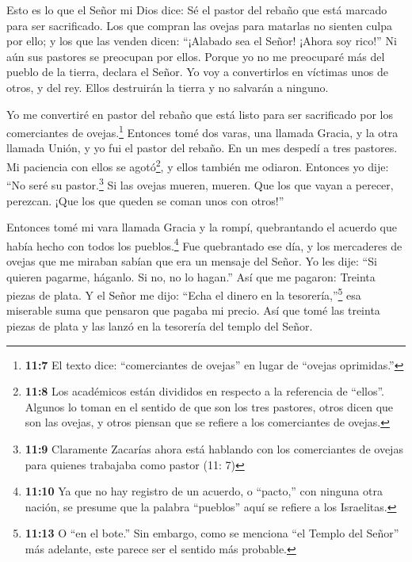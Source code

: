  Esto es lo que el Señor mi Dios dice: Sé el pastor del
rebaño que está marcado para ser sacrificado.  Los que
compran las ovejas para matarlas no sienten culpa por ello; y los que
las venden dicen: ``¡Alabado sea el Señor! ¡Ahora soy rico!'' Ni aún sus
pastores se preocupan por ellos.  Porque yo no me preocuparé
más del pueblo de la tierra, declara el Señor. Yo voy a convertirlos en
víctimas unos de otros, y del rey. Ellos destruirán la tierra y no
salvarán a ninguno.

 Yo me convertiré en pastor del rebaño que está listo para
ser sacrificado por los comerciantes de ovejas.\footnote{\textbf{11:7}
  El texto dice: ``comerciantes de ovejas'' en lugar de ``ovejas
  oprimidas.''} Entonces tomé dos varas, una llamada Gracia, y la otra
llamada Unión, y yo fui el pastor del rebaño.  En un mes
despedí a tres pastores. Mi paciencia con ellos se agotó\footnote{\textbf{11:8}
  Los académicos están divididos en respecto a la referencia de
  ``ellos''. Algunos lo toman en el sentido de que son los tres
  pastores, otros dicen que son las ovejas, y otros piensan que se
  refiere a los comerciantes de ovejas.}, y ellos también me odiaron.
 Entonces yo dije: ``No seré su pastor.\footnote{\textbf{11:9}
  Claramente Zacarías ahora está hablando con los comerciantes de ovejas
  para quienes trabajaba como pastor (11: 7)} Si las ovejas mueren,
mueren. Que los que vayan a perecer, perezcan. ¡Que los que queden se
coman unos con otros!''

 Entonces tomé mi vara llamada Gracia y la rompí,
quebrantando el acuerdo que había hecho con todos los
pueblos.\footnote{\textbf{11:10} Ya que no hay registro de un acuerdo, o
  ``pacto,'' con ninguna otra nación, se presume que la palabra
  ``pueblos'' aquí se refiere a los Israelitas.}  Fue
quebrantado ese día, y los mercaderes de ovejas que me miraban sabían
que era un mensaje del Señor.  Yo les dije: ``Si quieren
pagarme, háganlo. Si no, no lo hagan.'' Así que me pagaron: Treinta
piezas de plata.  Y el Señor me dijo: ``Echa el dinero en
la tesorería,''\footnote{\textbf{11:13} O ``en el bote.'' Sin embargo,
  como se menciona ``el Templo del Señor'' más adelante, este parece ser
  el sentido más probable.} esa miserable suma que pensaron que pagaba
mi precio. Así que tomé las treinta piezas de plata y las lanzó en la
tesorería del templo del Señor.

